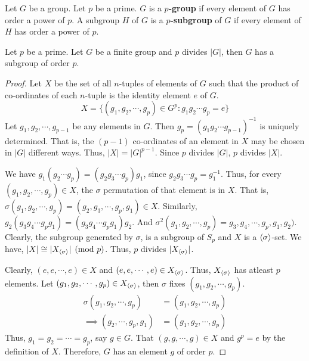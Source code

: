 \begin{definition}
	Let $G$ be a group. Let $p$ be a prime. $G$ is a \textbf{$p$-group} if every element of $G$ has order a power of $p$.
	A subgroup $H$ of $G$ is a \textbf{$p$-subgroup} of $G$ if every element of $H$ has order a power of $p$.
\end{definition}
\begin{theorem}[Cauchy]
	Let $p$ be a prime.
	Let $G$ be a finite group and $p$ divides $|G|$, then $G$ has a subgroup of order $p$.
\end{theorem}
\begin{proof}
	Let $X$ be the set of all $n$-tuples of elements of $G$ such that the product of co-ordinates of each $n$-tuple is the identity element $e$ of $G$.
	\begin{equation}
	X = \{ (g_1,g_2,\cdots,g_p) \in G^p : g_1g_2\cdots g_p = e\}
	\end{equation}
	Let $g_1,g_2,\cdots,g_{p-1}$ be any elements in $G$.
	Then $g_p = (g_1g_2\cdots g_{p-1})^{-1}$ is uniquely determined.
	That is, the $(p-1)$ co-ordinates of an element in $X$ may be chosen in $|G|$ different ways.
	Thus, $|X| = |G|^{p-1}$.
	Since $p$ divides $|G|$, $p$ divides $|X|$.

	We have $g_1(g_2\cdots g_p) = (g_2g_3\cdots g_p)g_1$, since $g_2g_3\cdots g_p = g_1^{-1}$.
	Thus, for every $(g_1,g_2,\cdots,g_p) \in X$, the $\sigma$ permutation of that element is in $X$.
	That is, $\sigma(g_1,g_2,\cdots,g_p) = (g_2,g_3,\cdots,g_p,g_1) \in X$.
	Similarly, $g_2(g_3g_4\cdots g_pg_1) = (g_3g_4\cdots g_pg_1)g_2$.
	And $\sigma^2(g_1,g_2,\cdots,g_p) = g_3,g_4,\cdots,g_p,g_1,g_2)$.
	Clearly, the subgroup generated by $\sigma$, is a subgroup of $S_p$ and $X$ is a $\langle \sigma\rangle$-set.
	We have, $|X| \cong |X_{\langle \sigma\rangle}| \pmod{p}$.
	Thus, $p$ divides $|X_{\langle \sigma\rangle}|$.

	Clearly, $(e,e,\cdots,e) \in X$ and $(e,e,\cdots,e) \in X_{\langle \sigma\rangle}$.
	Thus, $X_{\langle \sigma\rangle}$ has atleast $p$ elements.
	Let $(g_1,g_2,\cdots,g_p) \in X_{\langle \sigma\rangle}$, then $\sigma$ fixes $(g_1,g_2,\cdots,g_p)$.
	\begin{align*}
		\sigma(g_1,g_2,\cdots,g_p) & = (g_1,g_2,\cdots,g_p)\\
		\implies (g_2,\cdots,g_p,g_1) & = (g_1,g_2,\cdots,g_p)
	\end{align*}
	Thus, $g_1 = g_2 = \cdots = g_p$, say $g \in G$.
	That $(g,g,\cdots,g) \in X$ and $g^p = e$ by the definition of $X$.
	Therefore, $G$ has an element $g$ of order $p$.
\end{proof}
